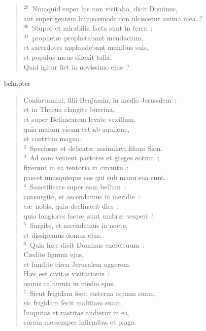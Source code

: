\begin{verse}
${}^{29}$~Numquid super his non visitabo, dicit Dominus,\\ aut super gentem hujuscemodi non ulciscetur anima mea~?\\
${}^{30}$~Stupor et mirabilia facta sunt in terra~:\\
${}^{31}$~prophet\ae\ prophetabant mendacium,\\ et sacerdotes applaudebant manibus suis,\\ et populus meus dilexit talia.\\ Quid igitur fiet in novissimo ejus~?\end{verse}


bchapter\begin{verse}\vspace{-19pt}Confortamini, filii Benjamin, in medio Jerusalem~:\\ et in Thecua clangite buccina,\\ et super Bethacarem levate vexillum,\\ quia malum visum est ab aquilone,\\ et contritio magna.\\
${}^{2}$~Specios\ae\ et delicat\ae\ assimilavi filiam Sion.\\
${}^{3}$~Ad eam venient pastores et greges eorum~;\\ fixerunt in ea tentoria in circuitu~:\\ pascet unusquisque eos qui sub manu sua sunt.\\
${}^{4}$~Sanctificate super eam bellum~:\\ consurgite, et ascendamus in meridie~:\\ v\ae\ nobis, quia declinavit dies~;\\ quia longiores fact\ae\ sunt umbr\ae\ vesperi~!\\
${}^{5}$~Surgite, et ascendamus in nocte,\\ et dissipemus domus ejus.\\
${}^{6}$~Quia h\ae c dicit Dominus exercituum~:\\ C\ae dite lignum ejus,\\ et fundite circa Jerusalem aggerem.\\ H\ae c est civitas visitationis~:\\ omnis calumnia in medio ejus.\\
${}^{7}$~Sicut frigidam fecit cisterna aquam suam,\\ sic frigidam fecit malitiam suam.\\ Iniquitas et vastitas audietur in ea,\\ coram me semper infirmitas et plaga.\\

\end{verse}
